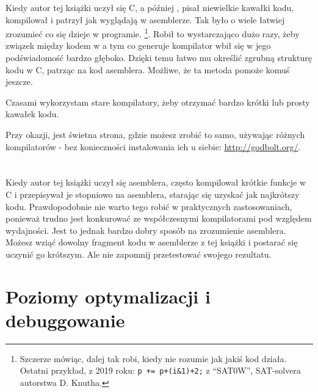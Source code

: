 
Kiedy autor tej książki uczył się C, a później \Cpp, pisał niewielkie kawałki kodu, kompilował
i patrzył jak wyglądają w asemblerze. Tak było o wiele łatwiej zrozumieć co się dzieje w programie.%
\footnote{Szczerze mówiąc, dalej tak robi, kiedy nie rozumie jak jakiś kod działa.
Ostatni przykład, z 2019 roku: \verb|p += p+(i&1)+2;| z ``SAT0W'', SAT-solvera autorstwa D. Knutha.}.
Robił to wystarczająco dużo razy, żeby związek między kodem w \CCpp a tym co generuje kompilator wbił się w jego podświadomość bardzo głęboko.
Dzięki temu łatwo mu określić zgrubną strukturę kodu w C, patrząc na kod asemblera.
Możliwe, że ta metoda pomoże komuś jeszcze.


Czasami wykorzystam stare kompilatory, żeby otrzymać bardzo krótki lub prosty kawałek kodu.

Przy okazji, jest świetna strona, gdzie możesz zrobić to samo, używając różnych kompilatorów - bez konieczności instalowania ich u siebie: \url{http://godbolt.org/}.

\section*{\Exercises}

Kiedy autor tej książki uczył się asemblera, często kompilował krótkie funkcje w C i przepisywał
je stopniowo na asemblera, starając się uzyskać jak najkrótszy kodu.
Prawdopodobnie nie warto tego robić w praktycznych zastosowaniach,
ponieważ trudno jest konkurować ze współczesnymi kompilatorami pod względem wydajności. Jest to jednak bardzo dobry sposób na zrozumienie asemblera.
Możesz wziąć dowolny fragment kodu w asemblerze z tej książki i postarać się uczynić go krótszym.
Ale nie zapomnij przetestować swojego rezultatu.

\section*{Poziomy optymalizacji i debuggowanie}


